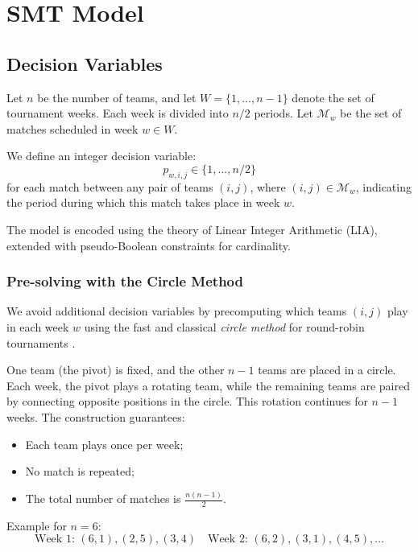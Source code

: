 


\section{SMT Model}

\subsection{Decision Variables}

Let $n$ be the number of teams, and let $W = \{1, \dots, n - 1\}$ denote the set of tournament weeks. Each week is divided into $n/2$ periods. Let $\mathcal{M}_w$ be the set of matches scheduled in week $w \in W$.

We define an integer decision variable:
\[
p_{w,i,j} \in \{1, \dots, n/2\}
\]
for each match between any pair of teams $(i,j)$, where $(i,j) \in \mathcal{M}_w$, indicating the period during which this match takes place in week $w$.

The model is encoded using the theory of Linear Integer Arithmetic (LIA), extended with pseudo-Boolean constraints for cardinality.

\subsubsection{Pre-solving with the Circle Method}
\label{CircleMatching}

We avoid additional decision variables by precomputing which teams $(i, j)$ play in each week $w$ using the fast and classical \emph{circle method} for round-robin tournaments \cite{dewerra1999}.

One team (the pivot) is fixed, and the other $n - 1$ teams are placed in a circle. Each week, the pivot plays a rotating team, while the remaining teams are paired by connecting opposite positions in the circle. This rotation continues for $n - 1$ weeks. The construction guarantees:
\begin{itemize}
    \item Each team plays once per week;
    \item No match is repeated;
    \item The total number of matches is $\frac{n(n-1)}{2}$.
\end{itemize}

Example for $n = 6$:
\[
\text{Week 1: } (6,1), (2,5), (3,4) \quad \text{Week 2: } (6,2), (3,1), (4,5), \dots
\]


